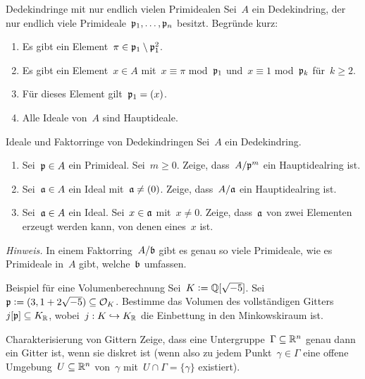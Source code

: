 \documentclass{uebblatt}
\begin{document}

\begin{aufgabe}{Dedekindringe mit nur endlich vielen Primidealen}
Sei~$A$ ein Dedekindring, der nur endlich viele
Primideale~$\mathfrak{p}_1,\ldots,\mathfrak{p}_n$ besitzt. Begründe kurz:
\begin{enumerate}
\item Es gibt ein Element~$\pi \in \mathfrak{p}_1 \setminus \mathfrak{p}_1^2$.
\item Es gibt ein Element~$x \in A$ mit~$x \equiv \pi$
mod~$\mathfrak{p}_1$ und~$x \equiv 1$ mod~$\mathfrak{p}_k$ für~$k \geq 2$.
\item Für dieses Element gilt~$\mathfrak{p}_1 = (x)$.
\item Alle Ideale von~$A$ sind Hauptideale.
\end{enumerate}
\end{aufgabe}

\begin{aufgabe}{Ideale und Faktorringe von Dedekindringen}
Sei~$A$ ein Dedekindring.
\begin{enumerate}
\item Sei~$\mathfrak{p} \in A$ ein Primideal. Sei~$m \geq 0$. Zeige, dass~$A/\mathfrak{p}^m$ ein Hauptidealring
ist.
\item Sei~$\mathfrak{a} \in A$ ein Ideal mit~$\mathfrak{a} \neq (0)$. Zeige, dass~$A/\mathfrak{a}$ ein
Hauptidealring ist.
\item Sei~$\mathfrak{a} \in A$ ein Ideal. Sei~$x \in \mathfrak{a}$ mit~$x \neq 0$. Zeige,
dass~$\mathfrak{a}$ von zwei Elementen erzeugt werden kann, von denen eines~$x$ ist.
\end{enumerate}
{\tiny\emph{Hinweis.} In einem Faktorring~$A/\mathfrak{b}$ gibt es genau so viele
Primideale, wie es Primideale in~$A$ gibt, welche~$\mathfrak{b}$ umfassen.\par}
\end{aufgabe}

\begin{aufgabe}{Beispiel für eine Volumenberechnung}
Sei~$K \vcentcolon= \mathbb{Q}[\sqrt{-5}]$. Sei~$\mathfrak{p} \vcentcolon= (3, 1 + 2\sqrt{-5}) \subseteq
\mathcal{O}_K$. Bestimme das Volumen des vollständigen
Gitters~$j[\mathfrak{p}] \subseteq K_{\mathbb{R}}$, wobei~$j : K \hookrightarrow K_{\mathbb{R}}$ die
Einbettung in den Minkowskiraum ist.
\end{aufgabe}

\begin{aufgabe}{Charakterisierung von Gittern}
Zeige, dass eine Untergruppe~$\Gamma \subseteq \mathbb{R}^n$ genau dann ein Gitter
ist, wenn sie diskret ist (wenn also zu jedem Punkt~$\gamma \in \Gamma$ eine
offene Umgebung~$U \subseteq \mathbb{R}^n$ von~$\gamma$ mit~$U \cap \Gamma =
\{\gamma\}$ existiert).
\end{aufgabe}
\end{document}
